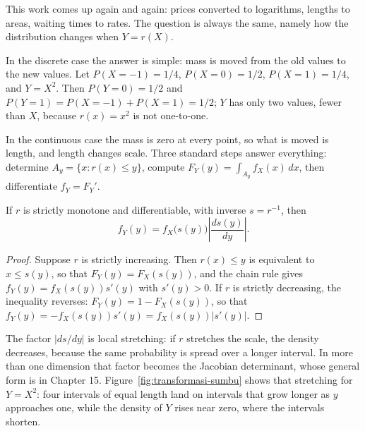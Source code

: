 This work comes up again and again: prices converted to logarithms, lengths to areas, waiting times
to rates. The question is always the same, namely how the distribution changes when
$Y=r(X)$.

In the discrete case the answer is simple: mass is moved from the old values to the new
values. Let $P(X=-1)=1/4$, $P(X=0)=1/2$, $P(X=1)=1/4$, and $Y=X^2$. Then
$P(Y=0)=1/2$ and $P(Y=1)=P(X=-1)+P(X=1)=1/2$; $Y$ has only two values, fewer
than $X$, because $r(x)=x^2$ is not one-to-one.

In the continuous case the mass is zero at every point, so what is moved is length,
and length changes scale. Three standard steps answer everything: determine
$A_y=\{x:r(x)\le y\}$, compute $F_Y(y)=\int_{A_y}f_X(x)\,dx$, then differentiate
$f_Y=F_Y'$.

\begin{teorema}
If $r$ is strictly monotone and differentiable, with inverse $s=r^{-1}$, then
\[
f_Y(y)=f_X\bigl(s(y)\bigr)\left|\frac{ds(y)}{dy}\right| .
\]
\end{teorema}

\begin{proof}
Suppose $r$ is strictly increasing. Then $r(x)\le y$ is equivalent to $x\le s(y)$, so that
$F_Y(y)=F_X(s(y))$, and the chain rule gives $f_Y(y)=f_X(s(y))s'(y)$ with
$s'(y)>0$. If $r$ is strictly decreasing, the inequality reverses: $F_Y(y)=1-F_X(s(y))$, so that
$f_Y(y)=-f_X(s(y))s'(y)=f_X(s(y))|s'(y)|$.
\end{proof}

The factor $|ds/dy|$ is local stretching: if $r$ stretches the scale, the density
decreases, because the same probability is spread over a longer interval. In more than
one dimension that factor becomes the Jacobian determinant, whose general form is in Chapter 15.
Figure~\ref{fig:transformasi-sumbu} shows that stretching for $Y=X^2$: four
intervals of equal length land on intervals that grow longer as $y$ approaches one,
while the density of $Y$ rises near zero, where the intervals shorten.

